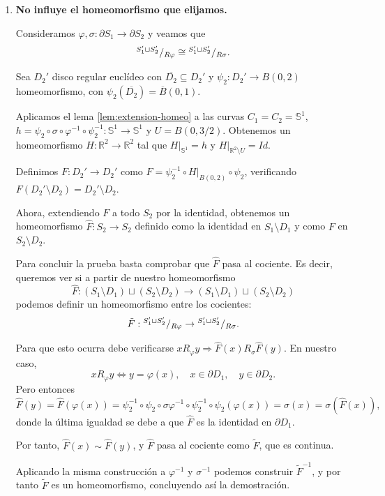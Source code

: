 {\begin{enumerate}
        Pero como $F$ es un homeomorfismo, $S_1 \setminus F(D_4) \cong S_1 \setminus D_4$, concluyendo así el paso 2.

        \item \textbf{No influye el homeomorfismo que elijamos.}

        Consideramos $\varphi,\sigma:\partial S_1\to\partial S_2$ y veamos que
        \[
        {^{S_1'\sqcup S_2'}}/{_{R\varphi}}\cong{^{S_1'\sqcup S_2'}}/{_{R\sigma}}.
        \]

        Sea $D_2'$ disco regular euclídeo con $\overline{D_2}\subseteq D_2'$ y $\psi_2 : D_2' \to B(0,2)$ homeomorfismo, con $\psi_2(\overline{D_2}) = \overline{B}(0,1)$. 

        Aplicamos el lema \ref{lem:extension-homeo} a las curvas $C_1 = C_2 = \mathbb{S}^1$, $h = \psi_2 \circ \sigma \circ \varphi^{-1} \circ \psi_2^{-1} : \mathbb{S}^1\to \mathbb{S}^1$ y $U = B(0,3/2)$. Obtenemos un homeomorfismo $H : \mathbb{R}^2 \to \mathbb{R}^2$ tal que $H\vert_{\mathbb{S}^1} = h$ y $H\vert_{\mathbb{R}^2\setminus U} = Id$. 

        Definimos $F:D_2' \to D_2'$ como $F = \psi_2^{-1} \circ H \vert_{B(0,2)} \circ \psi_2$, verificando $F(D_2'\setminus D_2) = D_2'\setminus D_2$. 

        Ahora, extendiendo $F$ a todo $S_2$ por la identidad, obtenemos un homeomorfismo $\hat{F} : S_2 \to S_2$ definido como la identidad en $S_1 \setminus D_1$ y como $F$ en $ S_2 \setminus D_2$.

        Para concluir la prueba basta comprobar que $\hat{F}$ pasa al cociente. Es decir, queremos ver si a partir de nuestro homeomorfismo 
        \[
        \hat{F} : (S_1\setminus D_1)\sqcup(S_2\setminus D_2) \to (S_1\setminus D_1)\sqcup(S_2\setminus D_2)
        \]
        podemos definir un homeomorfismo entre los cocientes:  
        \[
        \tilde{F} : {^{S_1'\sqcup S_2'}}/{_{R\varphi}} \to {^{S_1'\sqcup S_2'}}/{_{R\sigma}}.
        \]

        Para que esto ocurra debe verificarse $xR_\varphi y \Rightarrow \hat{F}(x) R_\sigma \hat{F}(y)$. En nuestro caso,  
        \[
        xR_\varphi y \iff y = \varphi(x), \quad x\in \partial D_1, \quad y\in \partial D_2. 
        \]
        Pero entonces
        \[
        \hat{F}(y) = \hat{F}(\varphi(x)) = \psi_2^{-1} \circ \psi_2 \circ \sigma \varphi^{-1} \circ \psi_2^{-1} \circ \psi_2(\varphi(x))
        = \sigma(x) = \sigma(\hat{F}(x)),
        \]
        donde la última igualdad se debe a que $\hat{F}$ es la identidad en $\partial D_1$. 

        Por tanto, $\hat{F}(x) \sim \hat{F}(y)$, y $\hat{F}$ pasa al cociente como $\tilde{F}$, que es continua. 

        Aplicando la misma construcción a $\varphi^{-1}$ y $\sigma^{-1}$ podemos construir $\tilde{F}^{-1}$, y por tanto $\tilde{F}$ es un homeomorfismo, concluyendo así la demostración.
    \end{enumerate}
}


